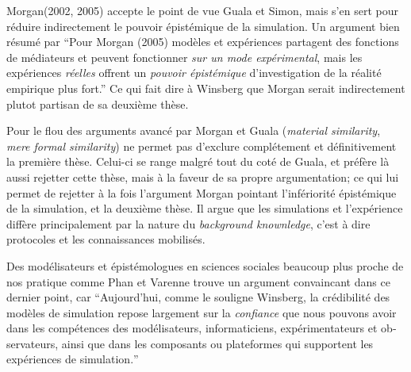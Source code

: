 
Morgan(2002, 2005) accepte le point de vue Guala et Simon, mais s'en sert pour réduire indirectement le pouvoir épistémique de la simulation. Un argument bien résumé par \textcite{Phan2008} \enquote{Pour Morgan (2005) modèles et expériences partagent des fonctions de médiateurs et peuvent fonctionner \textit{sur un mode expérimental}, mais les expériences \textit{réelles} offrent un \textit{pouvoir épistémique} d'investigation de la réalité empirique plus fort.} Ce qui fait dire à Winsberg que Morgan serait indirectement plutot partisan de sa deuxième thèse.

Pour \textcite{Winsberg2009} le flou des arguments avancé par Morgan et Guala  (\textit{material similarity}, \textit{mere formal similarity}) ne permet pas d'exclure complétement et définitivement la première thèse. Celui-ci se range malgré tout du coté de Guala, et préfère là aussi rejetter cette thèse, mais à la faveur de sa propre argumentation; ce qui lui permet de rejetter à la fois l'argument Morgan pointant l'infériorité épistémique de la simulation, et la deuxième thèse. Il argue que les simulations et l'expérience diffère principalement par la nature du \textit{background knownledge}, c'est à dire protocoles et les connaissances mobilisés.

Des modélisateurs et épistémologues en sciences sociales beaucoup plus proche de nos pratique comme Phan et Varenne trouve un argument convaincant dans ce dernier point, car \foreignquote{english}{Aujourd'hui, comme le souligne Winsberg, la crédibilité des modèles de simulation repose largement sur la \textit{confiance} que nous pouvons avoir dans les compétences des modélisateurs, informaticiens, expérimentateurs et observateurs, ainsi que dans les composants ou plateformes qui supportent les expériences de simulation.} \textcite{Phan2008}

